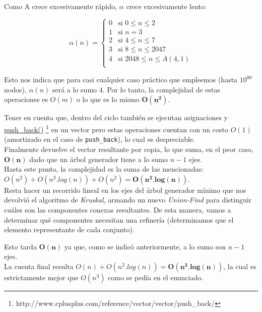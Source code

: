 	Como A crece excesivamente r\'apido, $\alpha$ crece excesivamente lento:

	\begin{equation*}
	\alpha(n) = 
	\begin{cases} 
		0  & \mbox{si } 0 \leq n \leq 2 \\
		1  & \mbox{si } n = 3 \\
		2  & \mbox{si } 4 \leq n \leq 7 \\
		3  & \mbox{si } 8 \leq n \leq 2047 \\
		4  & \mbox{si } 2048 \leq n \leq A(4,1) \\
	\end{cases}
	\end{equation*}

	Esto nos indica que para casi cualquier caso pr\'actico que empleemos (hasta $10^{80}$ nodos), $\alpha(n)$ ser\'a a lo sumo $4$. Por lo tanto, la complejidad de estas operaciones es $O(m)$ o lo que es lo mismo $\mathbf{O(n^2)}$.
	
	Tener en cuenta que, dentro del ciclo tambi\'en se ejecutan asignaciones y \href{http://www.cplusplus.com/reference/vector/vector/push_back/}{push\_back()} \footnote{http://www.cplusplus.com/reference/vector/vector/push_back/} en un vector pero estas operaciones cuentan con un costo $O(1)$ (amortizado en el caso de \texttt{push\_back}), lo cual es despreciable.\\

	Finalmente devuelve el vector resultante por copia, lo que suma, en el peor caso, $\mathbf{O(n)}$ dado que un \'arbol generador tiene a lo sumo $n-1$ ejes.\\

	Hasta este punto, la complejidad es la suma de las mencionadas:  $ O(n^2) + O(n^2.log(n)) + O(n^2) = \mathbf{O(n^2.log(n))}$.\\

	Resta hacer un recorrido lineal en los ejes del \'arbol generador m\'inimo que nos devolvi\'o el algoritmo de \textit{Kruskal}, armando un nuevo \textit{Union-Find} para distinguir cu\'ales son las componentes conexas resultantes. De esta manera, vamos a determinar 	qu\'e componentes necesitan una refiner\'ia (determinamos que el elemento representante de cada conjunto).
		
	 Esto tarda $\mathbf{O(n)}$ ya que, como se indic\'o anteriormente, a lo sumo son $n-1$ ejes.\\

	La cuenta final resulta $O(n) + O(n^2.log(n)) = \mathbf{O(n^2.log(n))}$, la cual es estrictamente mejor que $O(n^3)$ como se ped\'ia en el enunciado.


